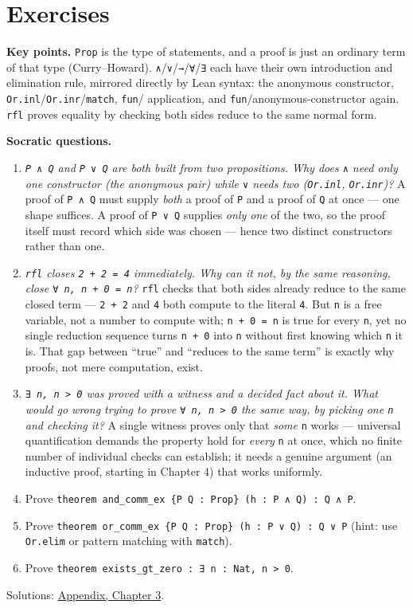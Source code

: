 \section{Exercises}\label{sec:03-propositions-and-proofs:08-exercises:1}

\textbf{Key points.} \texttt{Prop} is the type of statements, and a proof is just an ordinary term of that type (Curry--Howard). \texttt{∧}/\texttt{∨}/\texttt{→}/\texttt{∀}/\texttt{∃} each have their own introduction and elimination rule, mirrored directly by Lean syntax: the anonymous constructor, \texttt{Or.inl}/\texttt{Or.inr}/\texttt{match}, \texttt{fun}/ application, and \texttt{fun}/anonymous-constructor again. \texttt{rfl} proves equality by checking both sides reduce to the same normal form.

\textbf{Socratic questions.}

\begin{enumerate}
\def\labelenumi{\arabic{enumi}.}
\item
  \emph{\texttt{P ∧ Q} and \texttt{P ∨ Q} are both built from two propositions. Why does \texttt{∧} need only one constructor (the anonymous pair) while \texttt{∨} needs two (\texttt{Or.inl}, \texttt{Or.inr})?} A proof of \texttt{P ∧ Q} must supply \emph{both} a proof of \texttt{P} and a proof of \texttt{Q} at once --- one shape suffices. A proof of \texttt{P ∨ Q} supplies \emph{only one} of the two, so the proof itself must record which side was chosen --- hence two distinct constructors rather than one.
\item
  \emph{\texttt{rfl} closes \texttt{2 + 2 = 4} immediately. Why can it not, by the same reasoning, close \texttt{∀ n, n + 0 = n}?} \texttt{rfl} checks that both sides already reduce to the same closed term --- \texttt{2 + 2} and \texttt{4} both compute to the literal \texttt{4}. But \texttt{n} is a free variable, not a number to compute with; \texttt{n + 0 = n} is true for every \texttt{n}, yet no single reduction sequence turns \texttt{n + 0} into \texttt{n} without first knowing which \texttt{n} it is. That gap between ``true'' and ``reduces to the same term'' is exactly why proofs, not mere computation, exist.
\item
  \emph{\texttt{∃ n, n > 0} was proved with a witness and a decided fact about it. What would go wrong trying to prove \texttt{∀ n, n > 0} the same way, by picking one \texttt{n} and checking it?} A single witness proves only that \emph{some} \texttt{n} works --- universal quantification demands the property hold for \emph{every} \texttt{n} at once, which no finite number of individual checks can establish; it needs a genuine argument (an inductive proof, starting in Chapter 4) that works uniformly.
\item
  Prove \texttt{theorem and\_\allowbreak{}comm\_\allowbreak{}ex \{P Q : Prop\} (h : P ∧ Q) : Q ∧ P}.
\item
  Prove \texttt{theorem or\_\allowbreak{}comm\_\allowbreak{}ex \{P Q : Prop\} (h : P ∨ Q) : Q ∨ P} (hint: use \texttt{Or.elim} or pattern matching with \texttt{match}).
\item
  Prove \texttt{theorem exists\_\allowbreak{}gt\_\allowbreak{}zero : ∃ n : Nat, n > 0}.
\end{enumerate}

Solutions: \hyperref[sec:14-appendix-solutions:02-chapter-3:1]{Appendix, Chapter 3}.

